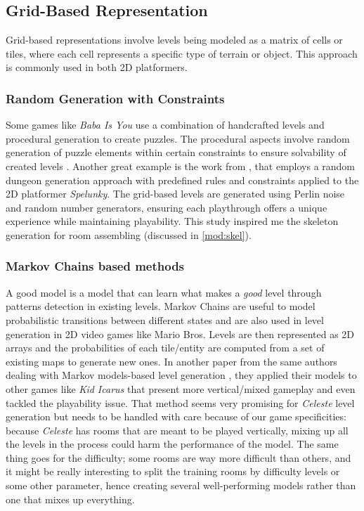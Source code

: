 \documentclass{article}
\newcommand{\Celeste}{\textit{Celeste} }
\begin{document}
\subsection{Grid-Based Representation}
Grid-based representations involve levels being modeled as a matrix of cells or tiles, where each cell represents a specific type of terrain or object. This approach is commonly used in both 2D platformers.

\subsubsection{Random Generation with Constraints}
Some games like \textit{Baba Is You} use a combination of handcrafted levels and procedural generation to create puzzles. The procedural aspects involve random generation of puzzle elements within certain constraints to ensure solvability of created levels \cite{baba}. Another great example is the work from \cite{spe}, that employs a random dungeon generation approach with predefined rules and constraints applied to the 2D platformer \textit{Spelunky}. The grid-based levels are generated using Perlin noise and random number generators, ensuring each playthrough offers a unique experience while maintaining playability. This study inspired me the skeleton generation for room assembling (discussed in \ref{mod:skel}).

\subsubsection{Markov Chains based methods \label{mdmc}}
A good model is a model that can learn what makes a \textit{good} level through patterns detection in existing levels. Markov Chains are useful to model probabilistic transitions between different states and are also used in level generation in 2D video games like Mario Bros. \cite{MC} Levels are then represented as 2D arrays and the probabilities of each tile/entity are computed from a set of existing maps to generate new ones. In another paper from the same authors dealing with Markov models-based level generation \cite{snod}, they applied their models to other games like \textit{Kid Icarus} that present more vertical/mixed gameplay and even tackled the playability issue. That method seems very promising for \Celeste level generation but needs to be handled with care because of our game specificities: because \Celeste has rooms that are meant to be played vertically, mixing up all the levels in the process could harm the performance of the model. The same thing goes for the difficulty; some rooms are way more difficult than others, and it might be really interesting to split the training rooms by difficulty levels or some other parameter, hence creating several well-performing models rather than one that mixes up everything.
\end{document}
